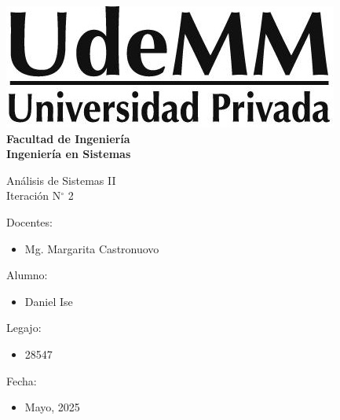 \begin{titlepage}
    \begin{center}
        \vspace*{.5cm}
        \includegraphics[scale=.5]{img/udemm-logo.png}\\
        \vspace{.2cm}
        \Large
        \textbf{Facultad de Ingeniería}\\
        \textbf{Ingeniería en Sistemas}\\
        \vspace{2cm}
    
        \Huge
        Análisis de Sistemas II\\
        Iteración N\(^\circ\) 2 \\
        \vfill
    
        \raggedright
        \Large
        Docentes:
        \begin{itemize}
            \item[] Mg. Margarita Castronuovo \\
        \end{itemize}
        Alumno:
        \begin{itemize}
            \item[] Daniel Ise
        \end{itemize}
        Legajo:
        \begin{itemize}
            \item[] 28547
        \end{itemize}
        Fecha:
        \begin{itemize}
            \item[] Mayo, 2025
        \end{itemize}
    \end{center}
\end{titlepage}
